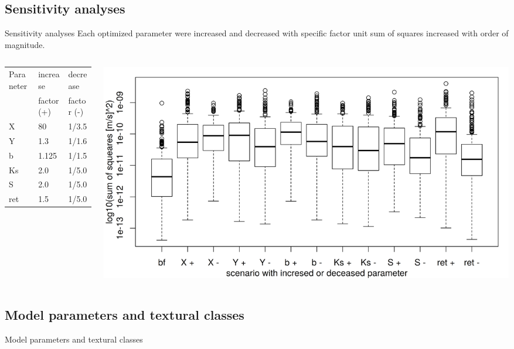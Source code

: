 
\subsection{Sensitivity analyses}
\begin{block}{Sensitivity analyses}
\justifying
Each optimized parameter were increased and decreased with specific factor unit sum of squares increased with order of magnitude. 
\begin{columns}
    \begin{column}{0.4\textwidth}
        \begin{table}[]
            \begin{tabular}{lll}
                \hline
                \hline
                Paraneter & increase   & decrease \\
                          & factor (+) & factor (-) \\
                \hline
                X         & 80                  & 1/3.5               \\
                Y         & 1.3                 & 1/1.6               \\
                b         & 1.125               & 1/1.5               \\
                Ks        & 2.0                 & 1/5.0               \\
                S         & 2.0                 & 1/5.0               \\
                ret       & 1.5                 & 1/5.0              \\
                \hline
                \hline
            \end{tabular}
        \end{table}
    \end{column}
    \begin{column}{0.6\textwidth}
        \includegraphics[width = \textwidth]{obr/sens.png}
    \end{column}
\end{columns}
\end{block}


\subsection{Model parameters and textural classes}
\begin{block}{Model parameters and textural classes}
\end{block}


